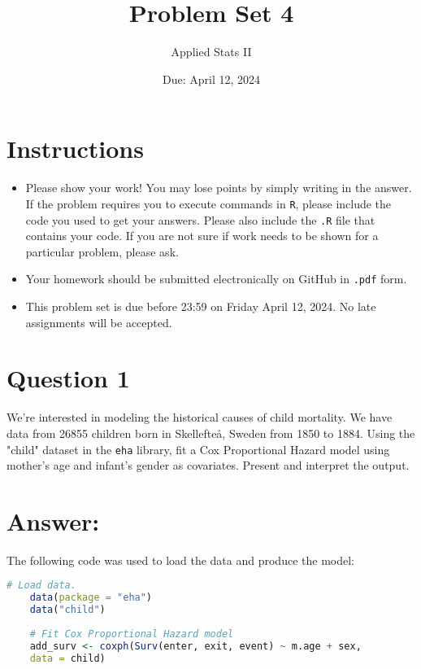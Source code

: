 \documentclass[12pt,letterpaper]{article}
\title{Problem Set 4}
\date{Due: April 12, 2024}
\author{Applied Stats II}
\begin{document}
	\maketitle
	\section*{Instructions}
	\begin{itemize}
	\item Please show your work! You may lose points by simply writing in the answer. If the problem requires you to execute commands in \texttt{R}, please include the code you used to get your answers. Please also include the \texttt{.R} file that contains your code. If you are not sure if work needs to be shown for a particular problem, please ask.
	\item Your homework should be submitted electronically on GitHub in \texttt{.pdf} form.
	\item This problem set is due before 23:59 on Friday April 12, 2024. No late assignments will be accepted.

	\end{itemize}

	\vspace{.25cm}
\section*{Question 1}
\vspace{.25cm}
\noindent We're interested in modeling the historical causes of child mortality. We have data from 26855 children born in Skellefteå, Sweden from 1850 to 1884. Using the "child" dataset in the \texttt{eha} library, fit a Cox Proportional Hazard model using mother's age and infant's gender as covariates. Present and interpret the output.

\section*{Answer:}

The following code was used to load the data and produce the model:

\begin{lstlisting}[language = R]
	# Load data.
	data(package = "eha")
	data("child")
	
	# Fit Cox Proportional Hazard model
	add_surv <- coxph(Surv(enter, exit, event) ~ m.age + sex,
	data = child)
\end{lstlisting}
\end{document}
